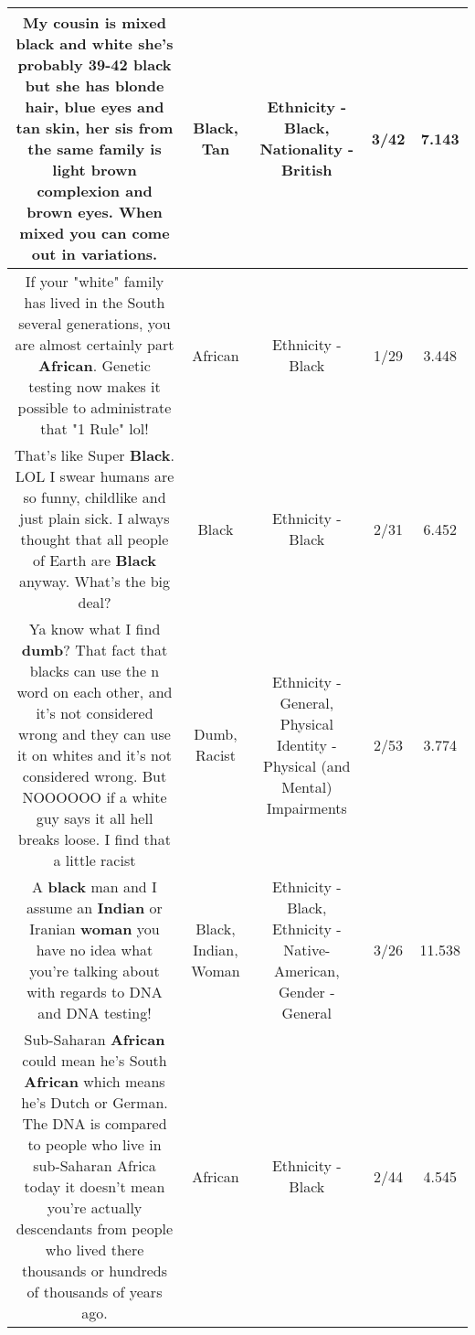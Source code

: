 \documentclass[11pt]{article}
\newlength\mylength
\begin{document}
\begin{center}
\begin{longtable}{|C{.65\mylength}|C{.30\mylength}|C{.12\mylength}|C{.12\mylength}|C{.12\mylength}|}
  \small My cousin is mixed \textbf{black} and white she's probably 39-42 \textbf{black} but she has blonde hair, blue eyes and \textbf{tan} skin, her sis from the same family is light brown complexion and brown eyes.  When mixed you can come out in variations.\normalsize   & Black, Tan & Ethnicity - Black, Nationality - British & 3/42 & 7.143 \\  \hline
  \small If your "white" family has lived in the South several generations, you are almost certainly part  \textbf{African}.  Genetic testing now makes it possible to administrate that "1 Rule" lol!\normalsize   & African & Ethnicity - Black & 1/29 & 3.448 \\  \hline
  \small That's like Super \textbf{Black}. LOL I swear humans are so funny, childlike and just plain sick. I always thought that all people of Earth are \textbf{Black} anyway. What's the big deal?\normalsize   & Black & Ethnicity - Black & 2/31 & 6.452 \\  \hline
  \small Ya know what I find \textbf{dumb}? That fact that blacks can use the n word on each other, and it's not considered wrong and they can use it on whites and it's not considered wrong. But NOOOOOO if a white guy says it all hell breaks loose. I find that a little racist\normalsize   & Dumb, Racist & Ethnicity - General, Physical Identity - Physical (and Mental) Impairments & 2/53 & 3.774 \\  \hline
  \small A \textbf{black} man and I assume an \textbf{Indian} or Iranian \textbf{woman} you have no idea what you're talking about with regards to DNA and DNA testing!\normalsize   & Black, Indian, Woman & Ethnicity - Black, Ethnicity - Native-American, Gender - General & 3/26 & 11.538 \\  \hline
  \small Sub-Saharan \textbf{African} could mean he's South \textbf{African} which means he's Dutch or German. The DNA is compared to people who live in sub-Saharan Africa today it doesn't mean you're actually descendants from people who lived there thousands or hundreds of thousands of years ago.\normalsize   & African & Ethnicity - Black & 2/44 & 4.545 \\  \hline

\end{longtable}
\end{center}
\end{document}
